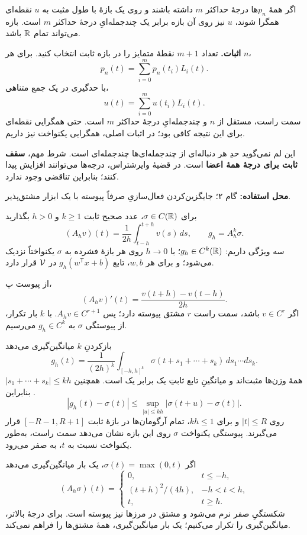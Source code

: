 اگر همهٔ $p_n$ها درجهٔ حداکثر $m$ داشته باشند و روی یک بازهٔ با طول مثبت به $u$ نقطه‌ای همگرا شوند، $u$ نیز روی آن بازه برابر یک چندجمله‌ایِ درجهٔ حداکثر $m$ است. بازه می‌تواند تمام $\mathbb R$ باشد.

\textbf{اثبات.} تعداد $m+1$ نقطهٔ متمایز را در بازه ثابت انتخاب کنید. برای هر $n$،
\[
p_n(t)=\sum_{i=0}^{m}p_n(t_i)L_i(t).
\]
با حدگیری در یک جمع متناهی،
\[
u(t)=\sum_{i=0}^{m}u(t_i)L_i(t).
\]
سمت راست، مستقل از $n$ و چندجمله‌ایِ درجهٔ حداکثر $m$ است. حتی همگرایی نقطه‌ای برای این نتیجه کافی بود؛ در اثبات اصلی، همگرایی یکنواخت نیز داریم.

\begin{intuition}
این لم نمی‌گوید حدِ هر دنباله‌ای از چندجمله‌ای‌ها چندجمله‌ای است. شرط مهم، \textbf{سقف ثابت برای درجهٔ همهٔ اعضا} است. در قضیهٔ وایرشتراس، درجه‌ها می‌توانند افزایش پیدا کنند؛ بنابراین تناقضی وجود ندارد.
\end{intuition}

\textbf{محل استفاده:} گام ۲؛ جایگزین‌کردن فعال‌سازیِ صرفاً پیوسته با یک ابزار مشتق‌پذیر.

برای $\sigma\in C(\mathbb R)$، عدد صحیح ثابت $k\geq1$ و $h>0$ بگذارید
\[
(A_hv)(t)=\frac1{2h}\int_{t-h}^{t+h}v(s)\,ds,
\qquad g_h=A_h^k\sigma.
\]
سه ویژگی داریم: $g_h\in C^k(\mathbb R)$؛ با $h\to0$ روی هر بازهٔ فشرده به $\sigma$ یکنواختاً نزدیک می‌شود؛ و برای هر $w,b$، تابع $g_h(w^{\mathsf T}x+b)$ در $\mathcal V$ قرار دارد.

از پیوست پ،
\[
(A_hv)'(t)=\frac{v(t+h)-v(t-h)}{2h}.
\]
اگر $v\in C^r$ باشد، سمت راست $r$ مشتق پیوسته دارد؛ پس $A_hv\in C^{r+1}$. با $k$ بار تکرار، از پیوستگی $\sigma$ به $g_h\in C^k$ می‌رسیم.

بازکردنِ $k$ میانگین‌گیری می‌دهد
\begin{equation}\label{eq:repeated-integral}
g_h(t)=\frac1{(2h)^k}\int_{[-h,h]^k}
\sigma(t+s_1+\cdots+s_k)\,ds_1\cdots ds_k.
\end{equation}
همهٔ وزن‌ها مثبت‌اند و میانگینِ تابع ثابتِ یک برابر یک است. همچنین $|s_1+\cdots+s_k|\leq kh$. بنابراین
\[
|g_h(t)-\sigma(t)|\leq
\sup_{|u|\leq kh}|\sigma(t+u)-\sigma(t)|.
\]
روی $|t|\leq R$ و برای $kh\leq1$، تمام آرگومان‌ها در بازهٔ ثابت $[-R-1,R+1]$ قرار می‌گیرند. پیوستگی یکنواخت $\sigma$ روی این بازه نشان می‌دهد سمت راست، به‌طور یکنواخت نسبت به $t$، به صفر می‌رود.

اگر $\sigma(t)=\max(0,t)$، یک بار میانگین‌گیری می‌دهد
\[
(A_h\sigma)(t)=
\begin{cases}
0,&t\leq-h,\\
(t+h)^2/(4h),&-h<t<h,\\
t,&t\geq h.
\end{cases}
\]
شکستگیِ صفر نرم می‌شود و مشتق در مرزها نیز پیوسته است. برای درجهٔ بالاتر، میانگین‌گیری را تکرار می‌کنیم؛ یک بار میانگین‌گیری، همهٔ مشتق‌ها را فراهم نمی‌کند.

